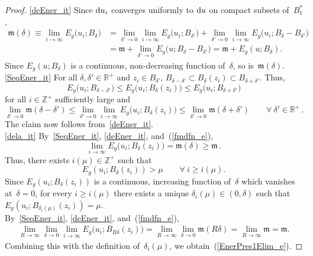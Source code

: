 \documentclass[11pt]{article}
\numberwithin{equation}{section}
\theoremstyle{definition}
\def\eref#1{(\ref{#1})}
\def\lra{\longrightarrow}
\def\fm{\mathfrak m}
\def\R{\mathbb R}
\def\Z{{\mathbb Z}}
\def\de{\delta}
\def\i{\infty}
\def\nd{\textnormal{d}}
\begin{document}
\begin{proof} 
\ref{deEner_it} Since $\nd u_i$ converges uniformly to $\nd u$ on compact subsets of~$B_1^*$,
\begin{equation*}\begin{split}
\fm(\de)\equiv\lim_{i\lra\i}E_g\big(u_i;B_{\de}\big)
&=\lim_{\de'\lra0}\lim_{i\lra\i}E_g\big(u_i;B_{\de'}\big)+
\lim_{\de'\lra0}\lim_{i\lra\i}E_g\big(u_i;B_{\de}\!-\!B_{\de'}\big)\\
&=\fm+\lim_{\de'\lra0}E_g\big(u;B_{\de}\!-\!B_{\de'}\big)
=\fm+E_g(u;B_{\de}).
\end{split}\end{equation*}
Since $E_g(u;B_{\de})$ is a continuous, non-decreasing function of~$\de$, 
so is~$\fm(\de)$.\\

\noindent
\ref{SeqEner_it} For all $\de,\de'\!\in\!\R^+$ and $z_i\!\in\!B_{\de'}$,
$B_{\de-\de'}\!\subset\!B_{\de}(z_i)\!\subset\!B_{\de+\de'}$.
Thus,
$$E_g\big(u_i;B_{\de-\de'}\big)\le E_g\big(u_i;B_{\de}(z_i)\big)
\le E_g\big(u_i;B_{\de+\de'}\big)$$
for all $i\!\in\!\Z^+$ sufficiently large and
$$\lim_{\de'\lra0}\fm(\de\!-\!\de')\le  
\lim_{\de'\lra0}\lim_{i\lra\i}E_g\big(u_i;B_{\de}(z_i)\big)
\le \lim_{\de'\lra0}\fm(\de\!+\!\de')
\qquad\forall~\de'\in\R^+\,.$$
The claim now follows from~\ref{deEner_it}.\\

\noindent
\ref{dela_it} By~\ref{SeqEner_it}, \ref{deEner_it}, and~\eref{fmdfn_e},
$$\lim_{i\lra\i}E_g\big(u_i;B_{\de}(z_i)\big)=\fm(\de)\ge\fm\,.$$
Thus, there exists $i(\mu)\!\in\!\Z^+$ such that 
$$E_g(u_i;B_{\de}(z_i))>\mu \qquad\forall~i\ge i(\mu).$$ 
Since $E_g(u_i;B_{\de}(z_i))$ is a continuous, increasing function of~$\de$
which vanishes at~$\de\!=\!0$,
for every $i\!\ge\!i(\mu)$
 there exists a unique $\de_i(\mu)\!\in\!(0,\de)$
such that $E_g(u_i;B_{\de_i(\mu)}(z_i))\!=\!\mu$.\\

\noindent
By~\ref{SeqEner_it}, \ref{deEner_it}, and~\eref{fmdfn_e},
\begin{equation*}\begin{split}
\lim_{R\lra\i}\lim_{\de\lra0}\lim_{i\lra\i}E_g\big(u_i;B_{R\de}(z_i)\big)
=\lim_{R\lra\i}\lim_{\de\lra0}\fm(R\de)=\lim_{R\lra\i}\fm=\fm.
\end{split}\end{equation*}
Combining this with the definition of~$\de_i(\mu)$, we obtain~\eref{EnerPres1Elim_e}.
\end{proof}
\end{document}
